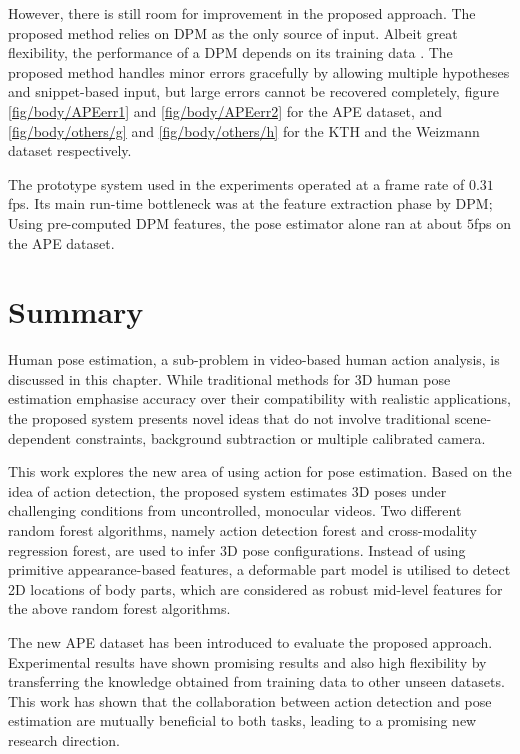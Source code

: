 However, there is still room for improvement in the proposed approach. The proposed method relies on DPM as the only source of input. Albeit great flexibility, the performance of a DPM depends on its training data \cite{Yang2011, Eichner2012}. The proposed method handles minor errors gracefully by allowing multiple hypotheses and snippet-based input, but large errors cannot be recovered completely, \eg figure \ref{fig/body/APEerr1} and \ref{fig/body/APEerr2} for the APE dataset, and \ref{fig/body/others/g} and \ref{fig/body/others/h} for the KTH and the Weizmann dataset respectively. 

The prototype system used in the experiments operated at a frame rate of $0.31$fps. Its main run-time bottleneck was at the feature extraction phase by DPM; Using pre-computed DPM features, the pose estimator alone ran at about $5$fps on the APE dataset. 



\section{Summary}
\label{sec/body/conclusions}

Human pose estimation, a sub-problem in video-based human action analysis, is discussed in this chapter.  
While traditional methods for 3D human pose estimation emphasise accuracy over their compatibility with realistic applications, the proposed system presents novel ideas that do not involve traditional scene-dependent constraints, \eg background subtraction or multiple calibrated camera.

This work explores the new area of using action for pose estimation. 
Based on the idea of action detection, the proposed system estimates 3D poses under challenging conditions from uncontrolled, monocular videos.
Two different random forest algorithms, namely action detection forest and cross-modality regression forest, are used to infer 3D pose configurations. Instead of using primitive appearance-based features, a deformable part model is utilised to detect 2D locations of body parts, which are considered as robust mid-level features for the above random forest algorithms.

The new APE dataset has been introduced to evaluate the proposed approach.  
Experimental results have shown promising results and also high flexibility by transferring the knowledge obtained from training data to other unseen datasets. This work has shown that the collaboration between action detection and pose estimation are mutually beneficial to both tasks, leading to a promising new research direction.
